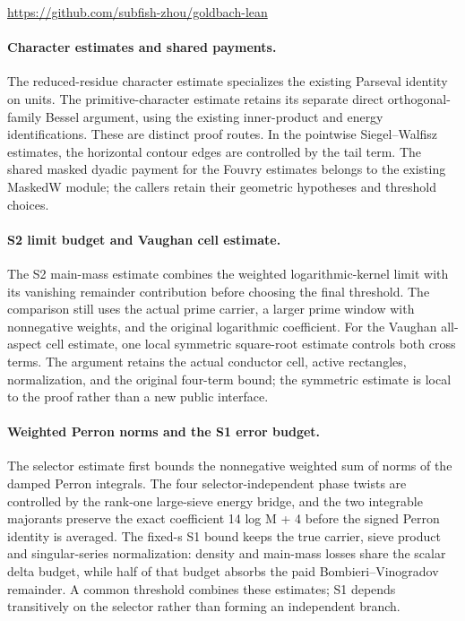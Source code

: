 \url{https://github.com/subfish-zhou/goldbach-lean}


\paragraph{Character estimates and shared payments.}
The reduced-residue character estimate specializes the existing Parseval identity on units. The primitive-character estimate retains its separate direct orthogonal-family Bessel argument, using the existing inner-product and energy identifications. These are distinct proof routes. In the pointwise Siegel--Walfisz estimates, the horizontal contour edges are controlled by the tail term. The shared masked dyadic payment for the Fouvry estimates belongs to the existing MaskedW module; the callers retain their geometric hypotheses and threshold choices.


\paragraph{S2 limit budget and Vaughan cell estimate.}
The S2 main-mass estimate combines the weighted logarithmic-kernel limit with its vanishing remainder contribution before choosing the final threshold. The comparison still uses the actual prime carrier, a larger prime window with nonnegative weights, and the original logarithmic coefficient. For the Vaughan all-aspect cell estimate, one local symmetric square-root estimate controls both cross terms. The argument retains the actual conductor cell, active rectangles, normalization, and the original four-term bound; the symmetric estimate is local to the proof rather than a new public interface.


\paragraph{Weighted Perron norms and the S1 error budget.}
The selector estimate first bounds the nonnegative weighted sum of norms of the damped Perron integrals. The four selector-independent phase twists are controlled by the rank-one large-sieve energy bridge, and the two integrable majorants preserve the exact coefficient 14 log M + 4 before the signed Perron identity is averaged. The fixed-s S1 bound keeps the true carrier, sieve product and singular-series normalization: density and main-mass losses share the scalar delta budget, while half of that budget absorbs the paid Bombieri--Vinogradov remainder. A common threshold combines these estimates; S1 depends transitively on the selector rather than forming an independent branch.
